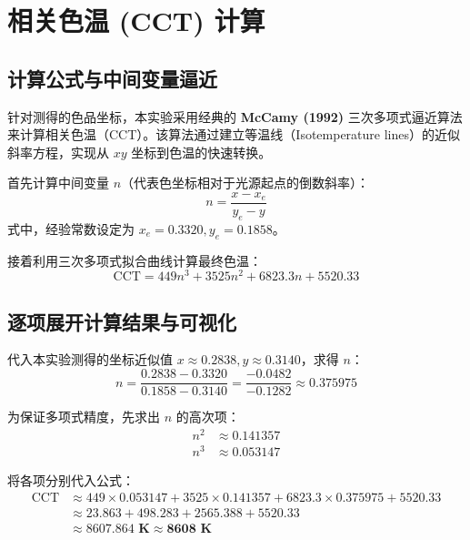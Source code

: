 \documentclass[12pt, a4paper]{ctexart}
\begin{document}
\newpage

\section{相关色温 (CCT) 计算}

\subsection{计算公式与中间变量逼近}
针对测得的色品坐标，本实验采用经典的 \textbf{McCamy (1992)} 三次多项式逼近算法来计算相关色温（CCT）。该算法通过建立等温线（Isotemperature lines）的近似斜率方程，实现从 $xy$ 坐标到色温的快速转换。

首先计算中间变量 $n$（代表色坐标相对于光源起点的倒数斜率）：
\begin{equation}
    n = \frac{x - x_e}{y_e - y} 
\end{equation}
式中，经验常数设定为 $x_e = 0.3320, y_e = 0.1858$。

接着利用三次多项式拟合曲线计算最终色温：
\begin{equation}
    \mathrm{CCT} = 449n^3 + 3525n^2 + 6823.3n + 5520.33
\end{equation}

\subsection{逐项展开计算结果与可视化}
代入本实验测得的坐标近似值 $x \approx 0.2838, y \approx 0.3140$，求得 $n$：
\begin{equation*}
    n = \frac{0.2838 - 0.3320}{0.1858 - 0.3140} = \frac{-0.0482}{-0.1282} \approx 0.375975
\end{equation*}

为保证多项式精度，先求出 $n$ 的高次项：
\begin{align*}
    n^2 &\approx 0.141357 \\
    n^3 &\approx 0.053147
\end{align*}

将各项分别代入公式：
\begin{align*}
    \mathrm{CCT} &\approx 449 \times 0.053147 + 3525 \times 0.141357 + 6823.3 \times 0.375975 + 5520.33 \\
        &\approx 23.863 + 498.283 + 2565.388 + 5520.33 \\
        &\approx \mathbf{8607.864 \text{ K}} \approx \mathbf{8608 \text{ K}}
\end{align*}
\end{document}
